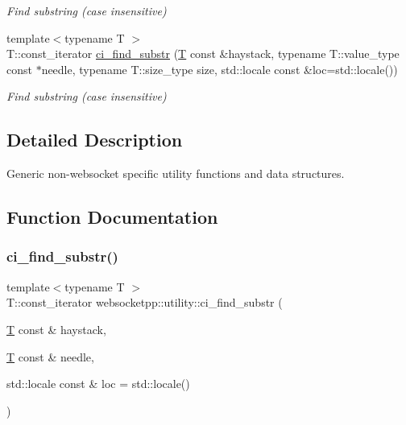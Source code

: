 \begin{DoxyCompactItemize}
\begin{DoxyCompactList}\small\item\em Find substring (case insensitive) \end{DoxyCompactList}\item 
{\footnotesize template$<$typename T $>$ }\\T\+::const\+\_\+iterator \mbox{\hyperlink{namespacewebsocketpp_1_1utility_a90383b2decd273f7a66bbb87c66b5ddd}{ci\+\_\+find\+\_\+substr}} (\mbox{\hyperlink{struct_t}{T}} const \&haystack, typename T\+::value\+\_\+type const $\ast$needle, typename T\+::size\+\_\+type size, std\+::locale const \&loc=std\+::locale())
\begin{DoxyCompactList}\small\item\em Find substring (case insensitive) \end{DoxyCompactList}\end{DoxyCompactItemize}


\subsection{Detailed Description}
Generic non-\/websocket specific utility functions and data structures. 

\subsection{Function Documentation}
\mbox{\label{namespacewebsocketpp_1_1utility_a484f1287b93cf58cc6514e46eed41568}} 
\subsubsection{\texorpdfstring{ci\+\_\+find\+\_\+substr()}{ci\_find\_substr()}\hspace{0.1cm}{\footnotesize\ttfamily [1/2]}}
{\footnotesize\ttfamily template$<$typename T $>$ \\
T\+::const\+\_\+iterator websocketpp\+::utility\+::ci\+\_\+find\+\_\+substr (\begin{DoxyParamCaption}\item[{\mbox{\hyperlink{struct_t}{T}} const \&}]{haystack,  }\item[{\mbox{\hyperlink{struct_t}{T}} const \&}]{needle,  }\item[{std\+::locale const \&}]{loc = {\ttfamily std\+:\+:locale()} }\end{DoxyParamCaption})}



